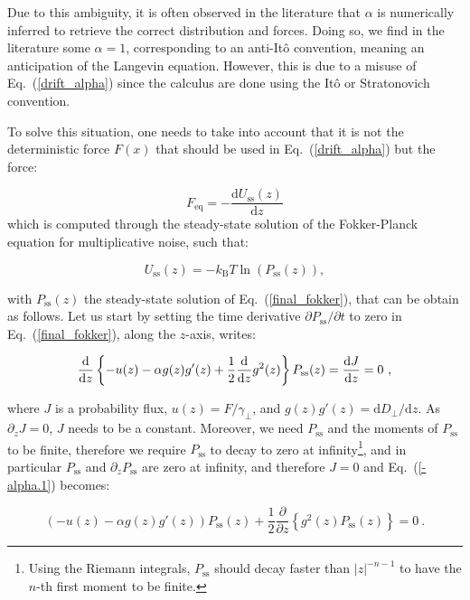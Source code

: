 Due to this ambiguity, it is often observed in the literature that $\alpha$ is numerically inferred to retrieve the correct distribution and forces. Doing so, we find in the literature some $\alpha =1$, corresponding to an anti-Itô convention, meaning an anticipation of the Langevin equation. However, this is due to a misuse of Eq.~(\ref{drift_alpha}) since the calculus are done using the Itô or Stratonovich convention.   

To solve this situation, one needs to take into account that it is not the deterministic force $F(x)$ that should be used in Eq.~(\ref{drift_alpha}) but the force:

\begin{equation}
	F_\mathrm{eq} = - \frac{\mathrm{d}U_\mathrm{ss}(z)}{\mathrm{d}z}
	\label{Feq}
\end{equation}
which is computed through the steady-state solution of the Fokker-Planck equation for multiplicative noise, such that:

\begin{equation}
	U_\mathrm{ss} (z) = - k_\mathrm{B}T \ln (P_\mathrm{ss}(z)),
	\label{Uss}
\end{equation}


with $P_\mathrm{ss}(z)$ the steady-state solution of Eq.~(\ref{final_fokker}), that can be obtain as follows. Let us start by setting the time derivative $\partial P_\mathrm{ss} / \partial t$ to zero in Eq.~(\ref{final_fokker}), along the $z$-axis, writes:

\begin{equation}
	\frac{\textnormal{d}}{\textnormal{d} z} \left\{ -u(z) - \alpha g(z)g'(z) + \frac{1}{2}\frac{\textnormal{d} }{\textnormal{d} z} g^2(z)  \right\} P_\mathrm{ss}(z)= \frac{\textnormal{d} J}{\textnormal{d} z} = 0~,
	\label{-alpha.1}
\end{equation}

where $J$ is a probability flux, $u(z) = F/\gamma_\bot$, and $g(z)g'(z) = \mathrm{d}D_\bot / \mathrm{d}z $. As $\partial _z J =0$, $J$ needs to be a constant. Moreover, we need $P_\mathrm{ss}$ and the moments of $P_\mathrm{ss}$ to be finite, therefore we require $P_\mathrm{ss}$ to decay to zero at infinity\footnote{Using the Riemann integrals, $P_\mathrm{ss}$ should decay faster than $|z|^{-n-1}$ to have the $n$-th first moment to be finite.}, and in particular $P_\mathrm{ss}$ and $\partial_z P_\mathrm{ss}$ are zero at infinity, and therefore $J=0$ and Eq.~(\ref{-alpha.1}) becomes:

\begin{equation}
	\left(-u(z) - \alpha g(z)g'(z)\right)P_\mathrm{ss}(z) + \frac{1}{2}\frac{\partial}{\partial z} \left\{ g^2(z) P_\mathrm{ss}(z) \right\} =0~.
	\label{-alpha.2}
\end{equation}

